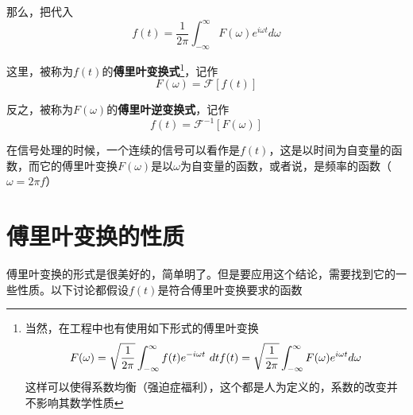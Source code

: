         那么，把代入
        \begin{equation}
            f(t)=\dfrac{1}{2\pi}\int_{-\infty}^{\infty}F(\omega) e^{i\omega t} d\omega
            \label{eq: 1.15}
        \end{equation}

        这里，被称为$f(t)$的\textbf{傅里叶变换式}\footnote{当然，在工程中也有使用如下形式的傅里叶变换
            $$
            F(\omega)=\sqrt{\dfrac{1}{2\pi}}\int_{-\infty}^{\infty}f(t)e^{-i\omega t}\ dt\\
            f(t)=\sqrt{\dfrac{1}{2\pi}}\int_{-\infty}^{\infty}F(\omega) e^{i\omega t} d\omega
            $$
            这样可以使得系数均衡（强迫症福利），这个都是人为定义的，系数的改变并不影响其数学性质}，记作
        \begin{equation}
            F(\omega)=\mathscr{F}[f(t)]
            \label{eq: 1.16}
        \end{equation}

        反之，被称为$F(\omega)$的\textbf{傅里叶逆变换式}，记作
        \begin{equation}
            f(t)=\mathscr{F}^{-1}[F(\omega)]
            \label{eq: 1.17}
        \end{equation}
        
        在信号处理的时候，一个连续的信号可以看作是$f(t)$，这是以时间为自变量的函数，而它的傅里叶变换$F(\omega)$是以$\omega$为自变量的函数，或者说，是频率的函数（$\omega=2\pi f$）

    \section{傅里叶变换的性质}

        傅里叶变换的形式是很美好的，简单明了。但是要应用这个结论，需要找到它的一些性质。以下讨论都假设$f(t)$是符合傅里叶变换要求的函数

